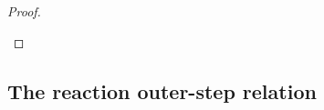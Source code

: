 \documentclass[11pt,a4paper,oneside,leqno]{article}
\makeatletter
\newcommand{\MARK}[1]{\textcolor{red}{#1}}
\numberwithin{equation}{section}
\def\<#1>{\langle#1\rangle}
\def\blocked{\mathit{blocked}}
\def\clear{\mathit{clear}}
\def\@raise#1#2#3{
  \setbox0=\hbox{#1}%
  \mathbin{%
    \hbox to\wd0{%
      \rlap{\box0}\hfill\raise#2\hbox{$\scriptstyle{#3}$}\hfill
    }%
  }%
}
\def\step#1{\@raise{$\to$}{1.1ex}{#1}}
\def\@ceuop#1{\mathop{\texttt{#1}}}%
\def\@ceubin#1{\mathbin{\texttt{#1}}}%
\def\ceu{\protect\@ceu}
\def\@ceu#1{%
  \bgroup
  \def\Skip{\@ceuop{skip}}%
  \def\Mem{\@ceuop{mem}}%
  \def\Attr##1##2{##1\coloneqq##2}%
  \def\AwaitExt{\@ceuop{awaitext}}%
  \def\Await{\@ceuop{await}}%
  \def\Emit{\@ceuop{emit}}%
  \def\Break{\@ceuop{break}}%
  \def\Ifelse##1##2##3{\@ceuop{if}##1\@ceuop{then}{##2}\@ceuop{else}{##3}}%
  \def\Loop{\@ceuop{loop}}%
  \def\And{\@ceubin{and}}%
  \def\Or{\@ceubin{or}}%
  \def\Fin{\@ceuop{fin}}%
  \def\AwaitingExt{\@ceuop{@awaitingext}}%
  \def\Awaiting{\@ceuop{@awaiting}}%
  \def\Emitting{\@ceuop{@emitting}}%
  \def\Atloop{\@ceuop{@loop}}%
  \def\Final{\@ceuop{halt}}%
  \def\True{\@ceuop{$\top$}}%
  \def\False{\@ceuop{$\bot$}}%
  \ensuremath{#1}\ignorespaces
  \egroup
}
\makeatother
\begin{document}
\begin{proof}
\begin{case}

  \end{case}
\end{proof}


\subsection{The reaction outer-step relation}
\label{sub:orig:outer}
\end{document}

